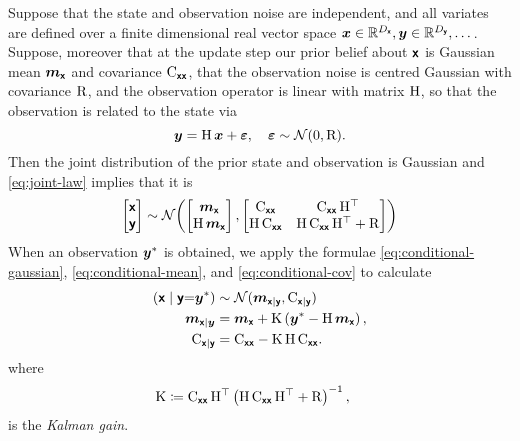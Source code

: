 \documentclass{article}
\begin{document}
Suppose that the state and observation noise are independent, and all variates are defined over a finite dimensional real vector space
$\boldsymbol{x}\in\mathbb{R}^{D_{\boldsymbol{\mathsf{x}}}}, \boldsymbol{y}\in \mathbb{R}^{D_{\boldsymbol{\mathsf{y}}}}, \dots$.
Suppose, moreover that at the update step our prior belief about $\boldsymbol{\mathsf{x}}$ is Gaussian mean \(\boldsymbol{m}_{\boldsymbol{\mathsf{x}}}\) and covariance \(\mathrm{C}_{\boldsymbol{\mathsf{xx}}}\), that the observation noise is centred Gaussian with covariance \(\mathrm{R}\), and the observation operator is linear with matrix \(\mathrm{H}\), so that the observation is related to the state via
\[
\boldsymbol{y} = \mathrm{H}\,\boldsymbol{x} + \boldsymbol{\varepsilon}, \quad \boldsymbol{\varepsilon} \sim \mathcal{N}(0,\mathrm{R}).
\]
Then the joint distribution of the prior state and observation is Gaussian and \eqref{eq:joint-law} implies that it is
\begin{align}
\begin{bmatrix}
\boldsymbol{\mathsf{x}} \\
\boldsymbol{\mathsf{y}}
\end{bmatrix}
&\sim \mathcal{N}\!\left(
\begin{bmatrix}
\boldsymbol{m}_{\boldsymbol{\mathsf{x}}} \\
\mathrm{H}\,\boldsymbol{m}_{\boldsymbol{\mathsf{x}}}
\end{bmatrix},
\begin{bmatrix}
\mathrm{C}_{\boldsymbol{\mathsf{xx}}} & \mathrm{C}_{\boldsymbol{\mathsf{xx}}}\,\mathrm{H}^\top \\
\mathrm{H}\,\mathrm{C}_{\boldsymbol{\mathsf{xx}}} & \mathrm{H}\,\mathrm{C}_{\boldsymbol{\mathsf{xx}}}\,\mathrm{H}^\top + \mathrm{R}
\end{bmatrix}
\right)\\
\end{align}
When an observation \(\boldsymbol{y}^*\) is obtained, we apply the formulae
\eqref{eq:conditional-gaussian}, \eqref{eq:conditional-mean}, and \eqref{eq:conditional-cov} to calculate
\begin{align}
\left(\boldsymbol{\mathsf{x}} \mid \boldsymbol{\mathsf{y}} {=} \boldsymbol{y}^*\right)
&\sim\mathcal{N}(\boldsymbol{m}_{\boldsymbol{\mathsf{x}}\mid\boldsymbol{\mathsf{y}}}, \mathrm{C}_{\boldsymbol{\mathsf{x}}\mid\boldsymbol{\mathsf{y}}})\\
\boldsymbol{m}_{\boldsymbol{\mathsf{x}}\mid \boldsymbol{y}}
&= \boldsymbol{m}_{\boldsymbol{\mathsf{x}}} + \mathrm{K} \left(\boldsymbol{y}^* - \mathrm{H}\,\boldsymbol{m}_{\boldsymbol{\mathsf{x}}}\right),\\
\mathrm{C}_{\boldsymbol{\mathsf{x}}\mid\boldsymbol{\mathsf{y}}}
&= \mathrm{C}_{\boldsymbol{\mathsf{xx}}} - \mathrm{K}\,\mathrm{H}\,\mathrm{C}_{\boldsymbol{\mathsf{xx}}}.
\end{align}
where
\begin{align}
\mathrm{K} &\coloneq \mathrm{C}_{\boldsymbol{\mathsf{xx}}}\,\mathrm{H}^\top \left(\mathrm{H}\,\mathrm{C}_{\boldsymbol{\mathsf{xx}}}\,\mathrm{H}^\top + \mathrm{R}\right)^{-1},\label{eq:kalman-gain}
\end{align}
is the \emph{Kalman gain}.
\end{document}
